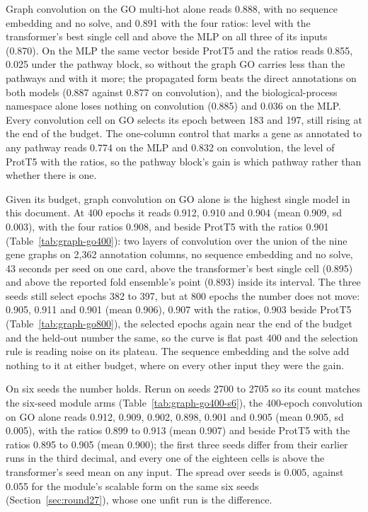 

Graph convolution on the GO multi-hot alone reads 0.888, with no sequence embedding
and no solve, and 0.891 with the four ratios: level with the transformer's best
single cell and above the MLP on all three of its inputs (0.870). On the MLP the
same vector beside ProtT5 and the ratios reads 0.855, 0.025 under the pathway block,
so without the graph GO carries less than the pathways and with it more; the
propagated form beats the direct annotations on both models (0.887 against 0.877 on
convolution), and the biological-process namespace alone loses nothing on convolution
(0.885) and 0.036 on the MLP. Every convolution cell on GO selects its epoch between
183 and 197, still rising at the end of the budget. The one-column control that marks a
gene as annotated to any pathway reads 0.774 on the MLP and 0.832 on convolution, the
level of ProtT5 with the ratios, so the pathway block's gain is which pathway rather
than whether there is one.

Given its budget, graph convolution on GO alone is the highest single model in this
document. At 400 epochs it reads 0.912, 0.910 and 0.904 (mean 0.909, sd 0.003), with
the four ratios 0.908, and beside ProtT5 with the ratios 0.901
(Table~\ref{tab:graph-go400}): two layers of convolution over the union of the nine
gene graphs on 2,362 annotation columns, no sequence embedding and no solve, 43
seconds per seed on one card, above the transformer's best single cell (0.895) and
above the reported fold ensemble's point (0.893) inside its interval. The three seeds
still select epochs 382 to 397, but at 800 epochs the number does not move: 0.905,
0.911 and 0.901 (mean 0.906), 0.907 with the ratios, 0.903 beside ProtT5
(Table~\ref{tab:graph-go800}), the selected epochs again near the end of the budget
and the held-out number the same, so the curve is flat past 400 and the selection
rule is reading noise on its plateau. The sequence embedding and the solve add nothing
to it at either budget, where on every other input they were the gain.





On six seeds the number holds. Rerun on seeds 2700 to 2705 so its count matches the
six-seed module arms (Table~\ref{tab:graph-go400-s6}), the 400-epoch convolution on GO
alone reads 0.912, 0.909, 0.902, 0.898, 0.901 and 0.905 (mean 0.905, sd 0.005), with
the ratios 0.899 to 0.913 (mean 0.907) and beside ProtT5 with the ratios 0.895 to
0.905 (mean 0.900); the first three seeds differ from their earlier runs in the third
decimal, and every one of the eighteen cells is above the transformer's seed mean on
any input. The spread over seeds is 0.005, against 0.055 for the module's scalable
form on the same six seeds (Section~\ref{sec:round27}), whose one unfit run is the
difference.

